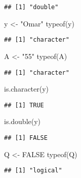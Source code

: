 \documentclass[
]{article}
\newenvironment{Shaded}{\begin{snugshade}}{\end{snugshade}}
\newcommand{\ConstantTok}[1]{\textcolor[rgb]{0.00,0.00,0.00}{#1}}
\newcommand{\FunctionTok}[1]{\textcolor[rgb]{0.00,0.00,0.00}{#1}}
\newcommand{\NormalTok}[1]{#1}
\newcommand{\OtherTok}[1]{\textcolor[rgb]{0.56,0.35,0.01}{#1}}
\newcommand{\StringTok}[1]{\textcolor[rgb]{0.31,0.60,0.02}{#1}}
\begin{document}
\begin{verbatim}
## [1] "double"
\end{verbatim}

\begin{Shaded}
\begin{Highlighting}[]
\NormalTok{y }\OtherTok{\textless{}{-}} \StringTok{"Omar"}
\FunctionTok{typeof}\NormalTok{(y)}
\end{Highlighting}
\end{Shaded}

\begin{verbatim}
## [1] "character"
\end{verbatim}

\begin{Shaded}
\begin{Highlighting}[]
\NormalTok{A }\OtherTok{\textless{}{-}} \StringTok{"55"}
\FunctionTok{typeof}\NormalTok{(A)}
\end{Highlighting}
\end{Shaded}

\begin{verbatim}
## [1] "character"
\end{verbatim}

\begin{Shaded}
\begin{Highlighting}[]
\FunctionTok{is.character}\NormalTok{(y)}
\end{Highlighting}
\end{Shaded}

\begin{verbatim}
## [1] TRUE
\end{verbatim}

\begin{Shaded}
\begin{Highlighting}[]
\FunctionTok{is.double}\NormalTok{(y)}
\end{Highlighting}
\end{Shaded}

\begin{verbatim}
## [1] FALSE
\end{verbatim}

\begin{Shaded}
\begin{Highlighting}[]
\NormalTok{Q }\OtherTok{\textless{}{-}} \ConstantTok{FALSE}
\FunctionTok{typeof}\NormalTok{(Q)}
\end{Highlighting}
\end{Shaded}

\begin{verbatim}
## [1] "logical"
\end{verbatim}
\end{document}
